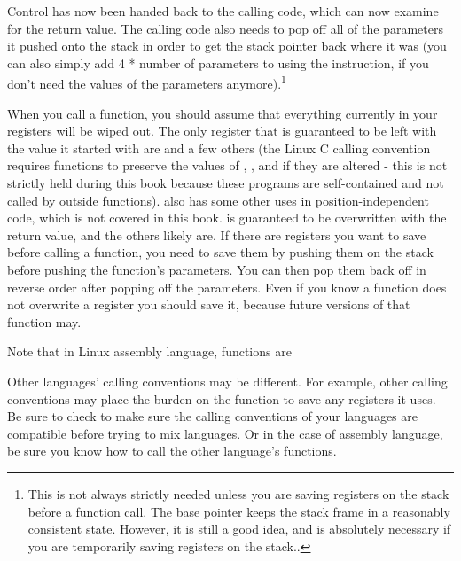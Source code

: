 Control has now been handed back to the calling code,
which can now examine {\eaxRegIdx} for the return value.  The calling
code also needs to pop off all of the parameters it 
pushed onto the stack in order to get the stack pointer
back where it was (you can also simply add 4 * number of parameters
to {\espRegIdx} using the  instruction, if 
you don't need the values of the parameters anymore).\footnote{This is not always strictly needed unless you are saving registers on the stack before a function call.  The base pointer keeps the stack frame in a reasonably consistent state.  However, it is still a good idea, and is absolutely necessary if you are temporarily saving registers on the stack..}

\begin{sidebar}
When you call a function, you should assume that everything
currently in your registers will be wiped out.  The only
register that is guaranteed to be left with the value it
started with are {\ebpRegIdx} and a few others (the Linux C calling 
convention requires functions to preserve the values of {\ebxRegIdx}, 
{\ediRegIdx}, and {\esiRegIdx} if they are altered - this is not
strictly held during this book because these programs are self-contained
and not called by outside functions).  {\ebxReg} also has some other uses
in position-independent code, which is not covered in this book.
{\eaxRegIdx} is guaranteed to be overwritten with the return value,
and the others likely are.  If there are registers you want
to save before calling a function, you need to save them by
pushing them on the stack before pushing the function's 
parameters.  You can then pop them back off in reverse order
after popping off the parameters.  Even if you know a function
does not overwrite a register you should save it, because
future versions of that function may.

Note that in Linux assembly language,
functions are 

Other languages' calling 
conventions
may be different.  For example, other calling conventions may
place the burden on the function to save any registers it uses.  Be sure
to check to make sure the calling conventions of your languages 
are compatible before trying to mix languages.  Or in the case of assembly
language, be sure you know how to call the other language's functions.
\end{sidebar}

